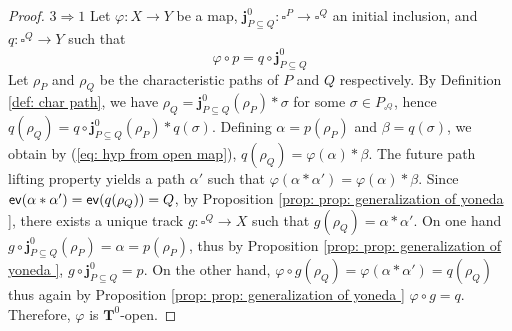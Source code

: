 \documentclass[11pt,a4paper,oldfontcommands]{memoir}
\newcommand*\ev{\textup{\textsf{ev}}}
\newcommand{\TrO}{\mathbf{T}}
\newcommand*\pobj[1]{\square^{#1}}
\newcommand*\jneda{\mathbf{j}}
\newtheorem{remark}[definition]{Remark}
\begin{document}
\begin{proof}
$3\Rightarrow 1$ Let $\varphi: X \rightarrow Y$ be a map, $\jneda^0_{P \subseteq Q} : \square^P \rightarrow \square^Q$ an initial inclusion, and $q: \square^Q \rightarrow Y$ such that
\begin{equation} \label{eq: hyp from open map}
 \varphi \circ p = q \circ \jneda^0_{P \subseteq Q}   
\end{equation}
Let $\rho_P$ and $\rho_Q$ be the characteristic paths of $P$ and $Q$ respectively. By Definition \ref{def: char path}, we have $\rho_Q= \jneda^0_{P \subseteq Q}(\rho_P)* \sigma$ for some $\sigma \in P_{\pobj{Q}}$, hence 
$q(\rho_Q)=q\circ \jneda^0_{P \subseteq Q} (\rho_P)* q(\sigma)$. Defining $\alpha=p(\rho_P)$ and $\beta=q(\sigma)$, we obtain by (\ref{eq: hyp from open map}), $q(\rho_Q)=\varphi(\alpha)* \beta$. The future path lifting property yields a path $\alpha'$ such that $\varphi(\alpha*\alpha')=\varphi(\alpha)*\beta$. Since $\ev(\alpha*\alpha')= \ev(q(\rho_Q))=Q$, by Proposition \ref{prop: prop: generalization of yoneda }, there exists a unique track %
$g: \pobj{Q} \to X$ such that $g(\rho_Q)=\alpha*\alpha'$. On one hand $g \circ \jneda^0_{P \subseteq Q} (\rho_P)= \alpha = p(\rho_P)$, %
thus by Proposition \ref{prop: prop: generalization of yoneda }, $g \circ \jneda^0_{P \subseteq Q} = p$. On the other hand, 
$\varphi \circ g (\rho_Q)= \varphi (\alpha*\alpha') = q (\rho_Q)$ thus again by Proposition \ref{prop: prop: generalization of yoneda } $\varphi \circ g = q$. Therefore, $\varphi$ is $\TrO^0$-open.  
\end{proof}

\end{document}
